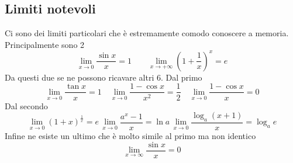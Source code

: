 \subsection{Limiti notevoli}
Ci sono dei limiti particolari che è estremamente comodo conoscere a memoria. Principalmente sono 2
\begin{equation*}
  \lim\limits_{x\to0}\frac{\sin x}{x}=1\qquad\lim\limits_{x\to+\infty}\left(1+\frac{1}{x}\right)^x=e
\end{equation*}
Da questi due se ne possono ricavare altri 6. Dal primo
\begin{equation*}
  \lim\limits_{x\to0}\frac{\tan x}{x}=1\quad\lim\limits_{x\to0}\frac{1-\cos x}{x^2}=\frac{1}{2}\quad
  \lim\limits_{x\to0}\frac{1-\cos x}{x}=0
\end{equation*}
Dal secondo
\begin{equation*}
  \lim\limits_{x\to0}(1+x)^{\frac{1}{x}}=e\,\lim\limits_{x\to0}\frac{a^x-1}{x}=\ln a\,
  \lim\limits_{x\to0}\frac{\log_a(x+1)}{x}=\log_a e
\end{equation*}
Infine ne esiste un ultimo che è molto simile al primo ma non identico
\begin{equation*}
  \lim_{x \to \infty} \frac{\sin x}{x} = 0 
\end{equation*}


